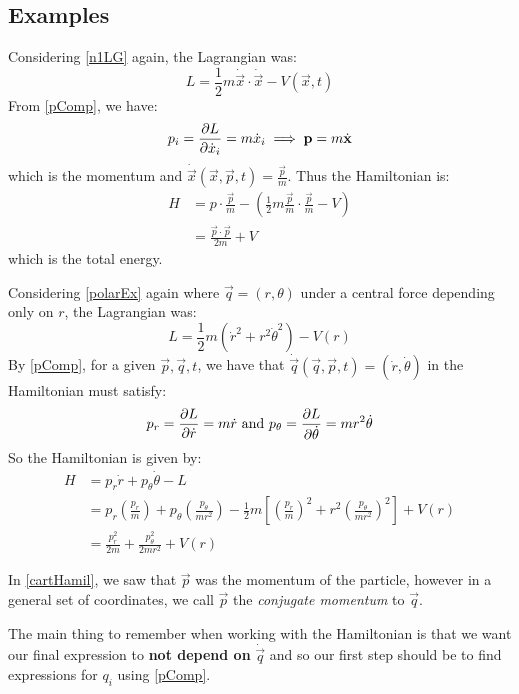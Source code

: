 \documentclass[../main.tex]{subfiles}
\begin{document}
\subsection{Examples}
\begin{example}
  Considering \cref{n1LG} again, the Lagrangian was: \label{cartHamil}
  \[
    L = \frac{1}{2} m \dot{\vec{x}} \cdot \dot{\vec{x}} - V(\vec{x}, t)
  \]
  From \cref{pComp}, we have:
  \[
    p_i = \pderiv{L}{\dot{x}_i} = m \dot{x}_i \implies \vec{p} = m \dot{\vec{x}}
  \]
  which is the momentum and $\dot{\vec{x}}(\vec{x}, \vec{p}, t) = \frac{\vec{p}}{m}$.
  Thus the Hamiltonian is:
  \begin{align*}
    H &= p \cdot \frac{\vec{p}}{m} - \left(\frac{1}{2}m \frac{\vec{p}}{m} \cdot \frac{\vec{p}}{m} - V\right) \\
      &= \frac{\vec{p} \cdot \vec{p}}{2m} + V
  \end{align*}
  which is the total energy.
\end{example}
\begin{example}
  Considering \cref{polarEx} again where $\vec{q} = (r, \theta)$ under a central force depending only on $r$, the Lagrangian was:
  \[
    L = \frac{1}{2} m (\dot{r}^2 + r^2 \dot{\theta}^2) - V(r)
  \]
  By \cref{pComp}, for a given $\vec{p}, \vec{q}, t$, we have that $\dot{\vec{q}}(\vec{q}, \vec{p}, t) = (\dot{r}, \dot{\theta})$ in the Hamiltonian must satisfy:
  \[
    p_r = \pderiv{L}{\dot{r}} = m\dot{r} \text{ and } p_{\theta} = \pderiv{L}{\dot{\theta}} = mr^2 \dot{\theta}
  \]
  So the Hamiltonian is given by:
  \begin{align*}
    H &= p_r \dot{r} + p_{\theta} \dot{\theta} - L \\
      &= p_r \left(\frac{p_r}{m}\right) + p_{\theta} \left(\frac{p_{\theta}}{mr^2}\right) - \frac{1}{2} m \left[\left(\frac{p_r}{m}\right)^2 + r^2 \left(\frac{p_{\theta}}{mr^2}\right)^2\right] + V(r) \\
      &= \frac{p^2_r}{2m} + \frac{p^2_{\theta}}{2mr^2} + V(r)
  \end{align*}
\end{example}
In \cref{cartHamil}, we saw that $\vec{p}$ was the momentum of the particle, however in a general set of coordinates, we call $\vec{p}$ the \textit{conjugate momentum} to $\vec{q}$.

\begin{remark}
  The main thing to remember when working with the Hamiltonian is that we want our final expression to \textbf{not depend on} $\dot{\vec{q}}$ and so our first step should be to find expressions for $q_i$ using \cref{pComp}.
\end{remark}
\end{document}
